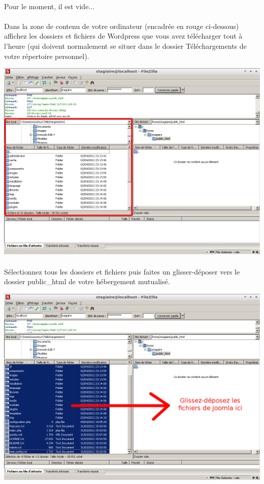\documentclass[10pt,a4paper]{article}
\begin{document}
\paragraph{}Pour le moment, il est vide...
\paragraph{}Dans la zone de contenu de votre ordinateur (encadrée en rouge ci-dessous) affichez les dossiers et fichiers de Wordpress que vous avez télécharger tout à l'heure (qui doivent normalement se situer dans le dossier Téléchargements de votre répertoire personnel).
\begin{center}
\includegraphics[scale=0.35]{img/0035.png}
\end{center}
\paragraph{}Sélectionnez tous les dossiers et fichiers puis faites un glisser-déposer vers le dossier public\_html de votre hébergement mutualisé.
\begin{center}
\includegraphics[scale=0.35]{img/0036.png}
\end{center}
\end{document}
